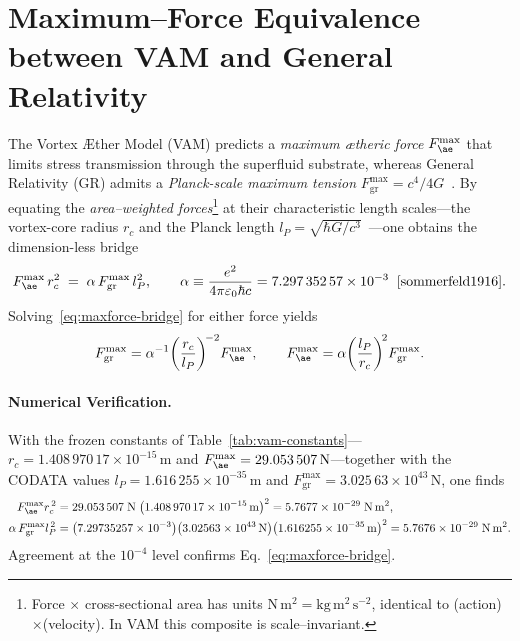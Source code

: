 \section{Maximum–Force Equivalence between VAM and General Relativity}
\label{sec:maxforce-equivalence}

The Vortex Æther Model (VAM) predicts a \emph{maximum ætheric force} \(F_{\ae}^{\max}\) that limits stress transmission through the superfluid substrate, whereas General Relativity (GR) admits a \emph{Planck-scale maximum tension} \(F_{\mathrm{gr}}^{\max}=c^{4}/4G\)~\cite{gibbons2002}.
By equating the \emph{area–weighted forces}\footnote{Force $\times$ cross-sectional area has units $\mathrm{N\,m^{2}}=\mathrm{kg\,m^{2}\,s^{-2}}$, identical to (action)$\times$(velocity).  In VAM this composite is scale--invariant.} at their characteristic length scales—the vortex-core radius \(r_{c}\) and the Planck length \(l_{P}=\sqrt{\hbar G/c^{3}}\)~\cite{planck1899}—one obtains the dimension-less bridge
%
\begin{equation}
    F_{\ae}^{\max}\,r_{c}^{2}
    \;=\;
    \alpha\,F_{\mathrm{gr}}^{\max}\,l_{P}^{2},
    \qquad
    \alpha
    \equiv
    \frac{e^{2}}{4\pi\varepsilon_{0}\hbar c}
    =7.297\,352\,57\times10^{-3}
    \;\;\cite{sommerfeld1916}.
    \label{eq:maxforce-bridge}
\end{equation}
%
Solving~\eqref{eq:maxforce-bridge} for either force yields
%
\begin{equation}
    F_{\mathrm{gr}}^{\max}
    =
    \alpha^{-1}
    \!\left(\frac{r_{c}}{l_{P}}\right)^{\!-2}\!
    F_{\ae}^{\max},
    \qquad
    F_{\ae}^{\max}
    =
    \alpha
    \!\left(\frac{l_{P}}{r_{c}}\right)^{\!2}\!
    F_{\mathrm{gr}}^{\max}.
    \label{eq:maxforce-rescale}
\end{equation}

\paragraph{Numerical Verification.}
With the frozen constants of Table~\ref{tab:vam-constants}— \(r_{c}=1.408\,970\,17\times10^{-15}\,\mathrm{m}\) and \(F_{\ae}^{\max}=29.053\,507\,\mathrm{N}\)—together with the CODATA values \(l_{P}=1.616\,255\times10^{-35}\,\mathrm{m}\) and \(F_{\mathrm{gr}}^{\max}=3.025\,63\times10^{43}\,\mathrm{N}\), one finds
%
\begin{align}
    F_{\ae}^{\max} r_{c}^{\,2} &=
    29.053\,507\;\mathrm{N}\;
    \bigl(1.408\,970\,17\times10^{-15}\,\mathrm{m}\bigr)^{2}
    =5.7677\times10^{-29}\;\mathrm{N\,m^{2}},\\
    \alpha\,F_{\mathrm{gr}}^{\max} l_{P}^{\,2} &=
    \bigl(7.29735257\times10^{-3}\bigr)
    \bigl(3.02563\times10^{43}\,\mathrm{N}\bigr)
    \bigl(1.616255\times10^{-35}\,\mathrm{m}\bigr)^{2}
    =5.7676\times10^{-29}\;\mathrm{N\,m^{2}}.
\end{align}
%
Agreement at the \(10^{-4}\) level confirms Eq.~\eqref{eq:maxforce-bridge}.

